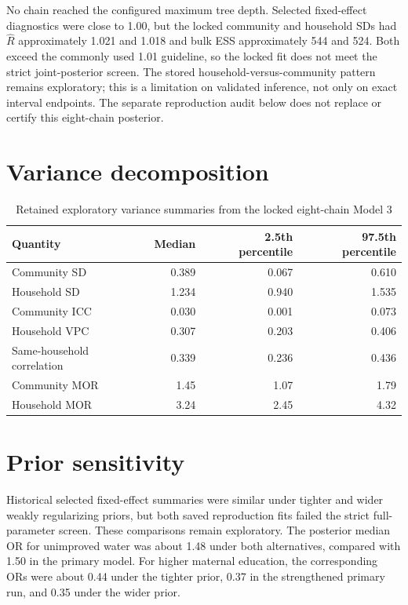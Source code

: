 \documentclass[10pt]{article}
\begin{document}
No chain reached the configured maximum tree depth. Selected fixed-effect diagnostics were close to 1.00, but the locked community and household SDs had $\hat R$ approximately 1.021 and 1.018 and bulk ESS approximately 544 and 524. Both exceed the commonly used 1.01 guideline, so the locked fit does not meet the strict joint-posterior screen. The stored household-versus-community pattern remains exploratory; this is a limitation on validated inference, not only on exact interval endpoints. The separate reproduction audit below does not replace or certify this eight-chain posterior.

\section{Variance decomposition}

\begin{table}[H]
\centering
\caption{Retained exploratory variance summaries from the locked eight-chain Model 3}
\begin{tabular}{lrrr}
\toprule
Quantity & Median & 2.5th percentile & 97.5th percentile \\
\midrule
Community SD & 0.389 & 0.067 & 0.610 \\
Household SD & 1.234 & 0.940 & 1.535 \\
Community ICC & 0.030 & 0.001 & 0.073 \\
Household VPC & 0.307 & 0.203 & 0.406 \\
Same-household correlation & 0.339 & 0.236 & 0.436 \\
Community MOR & 1.45 & 1.07 & 1.79 \\
Household MOR & 3.24 & 2.45 & 4.32 \\
\bottomrule
\end{tabular}
\end{table}

\section{Prior sensitivity}

Historical selected fixed-effect summaries were similar under tighter and wider weakly regularizing priors, but both saved reproduction fits failed the strict full-parameter screen. These comparisons remain exploratory. The posterior median OR for unimproved water was about 1.48 under both alternatives, compared with 1.50 in the primary model. For higher maternal education, the corresponding ORs were about 0.44 under the tighter prior, 0.37 in the strengthened primary run, and 0.35 under the wider prior.
\end{document}
